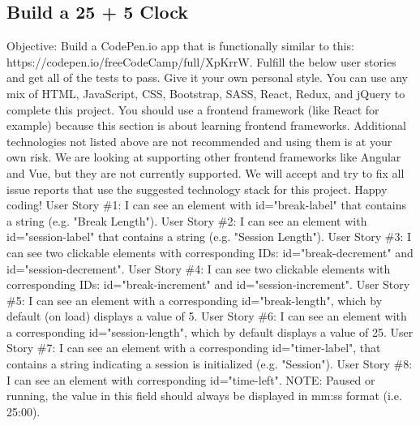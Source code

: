 \documentclass{article}%
\begin{document}
%
\subsection{Build a 25 + 5 Clock}%
\label{subsec:Builda25+5Clock}%
Objective: Build a CodePen.io app that is functionally similar to this: https://codepen.io/freeCodeCamp/full/XpKrrW.\newline%
Fulfill the below user stories and get all of the tests to pass. Give it your own personal style.\newline%
You can use any mix of HTML, JavaScript, CSS, Bootstrap, SASS, React, Redux, and jQuery to complete this project. You should use a frontend framework (like React for example) because this section is about learning frontend frameworks. Additional technologies not listed above are not recommended and using them is at your own risk. We are looking at supporting other frontend frameworks like Angular and Vue, but they are not currently supported. We will accept and try to fix all issue reports that use the suggested technology stack for this project. Happy coding!\newline%
User Story \#1: I can see an element with id="break{-}label" that contains a string (e.g. "Break Length").\newline%
User Story \#2: I can see an element with id="session{-}label" that contains a string (e.g. "Session Length").\newline%
User Story \#3: I can see two clickable elements with corresponding IDs: id="break{-}decrement" and id="session{-}decrement".\newline%
User Story \#4: I can see two clickable elements with corresponding IDs: id="break{-}increment" and id="session{-}increment".\newline%
User Story \#5: I can see an element with a corresponding id="break{-}length", which by default (on load) displays a value of 5.\newline%
User Story \#6: I can see an element with a corresponding id="session{-}length", which by default displays a value of 25.\newline%
User Story \#7: I can see an element with a corresponding id="timer{-}label", that contains a string indicating a session is initialized (e.g. "Session").\newline%
User Story \#8: I can see an element with corresponding id="time{-}left". NOTE: Paused or running, the value in this field should always be displayed in mm:ss format (i.e. 25:00).\newline%
\end{document}
